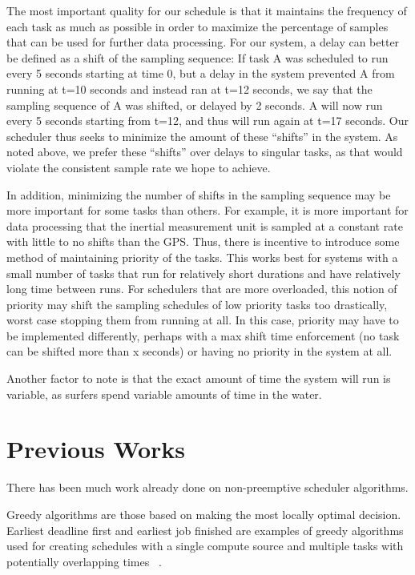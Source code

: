 \documentclass{article}
\begin{document}
The most important quality for our schedule is that it maintains the frequency of each task as much as possible in order to maximize the percentage of samples that can be used for further data processing. For our system, a delay can better be defined as a shift of the sampling sequence: If task A was scheduled to run every 5 seconds starting at time 0, but a delay in the system prevented A from running at t=10 seconds and instead ran at t=12 seconds, we say that the sampling sequence of A was shifted, or delayed by 2 seconds. A will now run every 5 seconds starting from t=12, and thus will run again at t=17 seconds. Our scheduler thus seeks to minimize the amount of these “shifts” in the system. As noted above, we prefer these “shifts” over delays to singular tasks, as that would violate the consistent sample rate we hope to achieve. 


In addition, minimizing the number of shifts in the sampling sequence may be more important for some tasks than others. For example, it is more important for data processing that the inertial measurement unit is sampled at a constant rate with little to no shifts than the GPS. Thus, there is incentive to introduce some method of maintaining priority of the tasks. This works best for systems with a small number of tasks that run for relatively short durations and have relatively long time between runs. For schedulers that are more overloaded, this notion of priority may shift the sampling schedules of low priority tasks too drastically, worst case stopping them from running at all. In this case, priority may have to be implemented differently, perhaps with a max shift time enforcement (no task can be shifted more than x seconds) or having no priority in the system at all. 

Another factor to note is that the exact amount of time the system will run is variable, as surfers spend variable amounts of time in the water. 

\section{Previous Works}
There has been much work already done on non-preemptive scheduler algorithms. 

Greedy algorithms are those based on making the most locally optimal decision. Earliest deadline first and earliest job finished are examples of greedy algorithms used for creating schedules with a single compute source and multiple tasks with potentially overlapping times ~\cite{Karger97}. 
\end{document}
